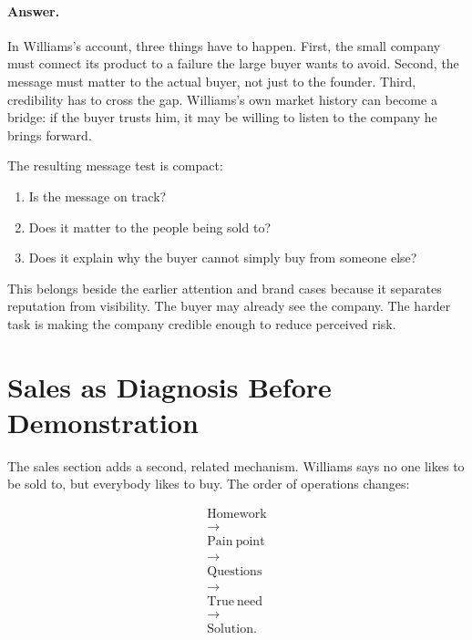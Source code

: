 \documentclass[11pt,oneside]{book}
\begin{document}
\paragraph{Answer.}
In Williams's account, three things have to happen. First, the small company must connect its product to a failure the large buyer wants to avoid. Second, the message must matter to the actual buyer, not just to the founder. Third, credibility has to cross the gap. Williams's own market history can become a bridge: if the buyer trusts him, it may be willing to listen to the company he brings forward.

The resulting message test is compact:

\begin{enumerate}
\item Is the message on track?
\item Does it matter to the people being sold to?
\item Does it explain why the buyer cannot simply buy from someone else?
\end{enumerate}

This belongs beside the earlier attention and brand cases because it separates reputation from visibility. The buyer may already see the company. The harder task is making the company credible enough to reduce perceived risk.

\section{Sales as Diagnosis Before Demonstration}

The sales section adds a second, related mechanism. Williams says no one likes to be sold to, but everybody likes to buy. The order of operations changes:

\begin{equation}
\begin{gathered}
\mathrm{Homework}\\
\longrightarrow\\
\mathrm{Pain\ point}\\
\longrightarrow\\
\mathrm{Questions}\\
\longrightarrow\\
\mathrm{True\ need}\\
\longrightarrow\\
\mathrm{Solution}.
\end{gathered}
\end{equation}
\end{document}
